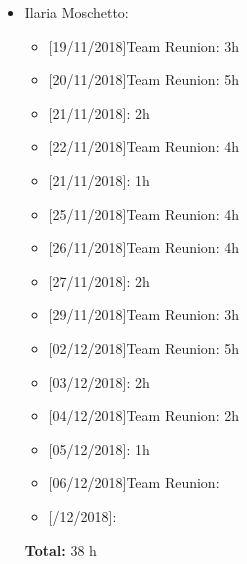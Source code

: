 \begin{itemize}
\item Ilaria Moschetto: 
\begin{itemize}
    \item {[}19/11/2018{]}Team Reunion: 3h
    \item {[}20/11/2018{]}Team Reunion: 5h
    \item {[}21/11/2018{]}: 2h
    \item {[}22/11/2018{]}Team Reunion: 4h
    \item {[}21/11/2018{]}: 1h
    \item {[}25/11/2018{]}Team Reunion: 4h
    \item {[}26/11/2018{]}Team Reunion: 4h
    \item {[}27/11/2018{]}: 2h
    \item {[}29/11/2018{]}Team Reunion: 3h
    \item {[}02/12/2018{]}Team Reunion: 5h
    \item {[}03/12/2018{]}: 2h
    \item {[}04/12/2018{]}Team Reunion:  2h
    \item {[}05/12/2018{]}: 1h
    \item {[}06/12/2018{]}Team Reunion:
    \item {[}/12/2018{]}:
\end{itemize}

\textbf{Total:} 38 h
\end{itemize}